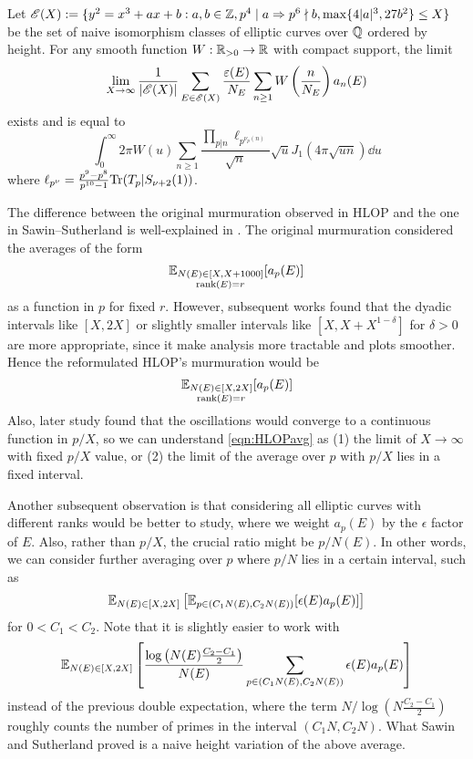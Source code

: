 \begin{theorem}
    Let $\mathscr{E}(X) := \{y^2 = x^3 + ax + b: a, b \in \mathbb{Z}, p^4 \mid a \Rightarrow p^6 \nmid b, \max\{4|a|^3, 27 b^2\} \le X\}$ be the set of naive isomorphism classes of elliptic curves over $\mathbb{Q}$ ordered by height.
    For any smooth function $W : \mathbb{R}_{>0} \to \mathbb{R}$ with compact support, the limit
    \begin{equation}
        \lim_{X \to \infty} \frac{1}{|\mathscr{E}(X)|} \sum_{E \in \mathscr{E}(X)} \frac{\varepsilon(E)}{N_E} \sum_{n \ge 1} W\left(\frac{n}{N_E}\right) a_n(E)
    \end{equation}
    exists and is equal to
    \begin{equation}
        \int_{0}^{\infty} 2 \pi W(u) \sum_{n \ge 1} \frac{\prod_{p | n} \ell_{p^{\nu_p(n)}}}{\sqrt{n}} \sqrt{u} J_1 (4 \pi \sqrt{un}) \dd u
    \end{equation}
    where $\ell_{p^\nu} = \frac{p^9 - p^8}{p^{10} - 1} \mathrm{Tr}(T_p | S_{\nu + 2}(1))$.
\end{theorem}

The difference between the original murmuration observed in HLOP \cite{he2024murmurations} and the one in Sawin--Sutherland is well-explained in \cite[Section 1.1]{sawin2025murmurations}.
The original murmuration considered the averages of the form 
\[
\mathbb{E}_{\substack{N(E) \in [X, X + 1000] \\ \mathrm{rank}(E) = r}} [a_p(E)]
\]
as a function in $p$ for fixed $r$.
However, subsequent works found that the dyadic intervals like $[X, 2X]$ or slightly smaller intervals like $[X, X + X^{1 - \delta}]$ for $\delta > 0$ are more appropriate, since it make analysis more tractable and plots smoother.
Hence the reformulated HLOP's murmuration would be
\begin{equation}
\label{eqn:HLOPavg}
\mathbb{E}_{\substack{N(E) \in [X, 2X] \\ \mathrm{rank}(E) = r}} [a_p(E)]
\end{equation}
Also, later study found that the oscillations would converge to a continuous function in $p / X$, so we can understand \eqref{eqn:HLOPavg} as (1) the limit of $X \to \infty$ with fixed $p / X$ value, or (2) the limit of the average over $p$ with $p / X$ lies in a fixed interval.

Another subsequent observation is that considering all elliptic curves with different ranks would be better to study, where we weight $a_p(E)$ by the $\epsilon$ factor of $E$.
Also, rather than $p / X$, the crucial ratio might be $p / N(E)$. In other words, we can consider further averaging over $p$ where $p / N$ lies in a certain interval, such as
\[
\mathbb{E}_{N(E) \in [X, 2X]} \left[ \mathbb{E}_{p \in (C_1 N(E), C_2 N(E))} [\epsilon(E) a_p(E)]\right]
\]
for $0 < C_1 < C_2$.
Note that it is slightly easier to work with
\[
\mathbb{E}_{N(E) \in [X, 2X]} \left[ \frac{\log \left(N(E)\frac{C_2 - C_1}{2}\right)}{N(E)}\sum_{p \in (C_1 N(E), C_2 N(E))} \epsilon(E) a_p(E)\right]
\]
instead of the previous double expectation, where the term $N / \log(N \frac{C_2 - C_1}{2})$ roughly counts the number of primes in the interval $(C_1 N, C_2 N)$.
What Sawin and Sutherland proved is a naive height variation of the above average.

